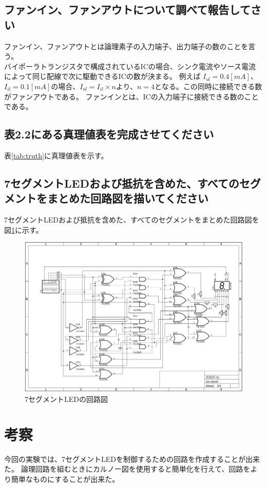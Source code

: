\documentclass[a4paper,11pt,dvipdfmx]{jsarticle}
\begin{document}
  \subsection{ファンイン、ファンアウトについて調べて報告してさい}
  ファンイン、ファンアウトとは論理素子の入力端子、出力端子の数のことを言う。\\
  バイポーラトランジスタで構成されているICの場合、シンク電流やソース電流によって同じ配線で次に駆動できるICの数が決まる。
  例えば $I_{ol} = 0.4[mA]$、 $ I_{il} = 0.1[mA]$の場合、$I_{ol} = I_{il} \times n$より、$n = 4$となる。この同時に接続できる数がファンアウトである。
  ファンインとは、ICの入力端子に接続できる数のことである。
  \subsection{表2.2にある真理値表を完成させてください}
  表\ref{tab:truth}に真理値表を示す。
  \subsection{7セグメントLEDおよび抵抗を含めた、すべてのセグメントをまとめた回路図を描いてください}
  7セグメントLEDおよび抵抗を含めた、すべてのセグメントをまとめた回路図を図\ref{fig:circit}に示す。
  \begin{figure}[htbp]
    \centering
    \includegraphics[angle = 90,width = 0.95\columnwidth]{./images/circit.png}
    \caption{7セグメントLEDの回路図}
    \label{fig:circit}
  \end{figure}
  \newpage
  \section{考察}
今回の実験では、7セグメントLEDを制御するための回路を作成することが出来た。
論理回路を組むときにカルノー図を使用すると簡単化を行えて、回路をより簡単なものにすることが出来た。
\end{document}
